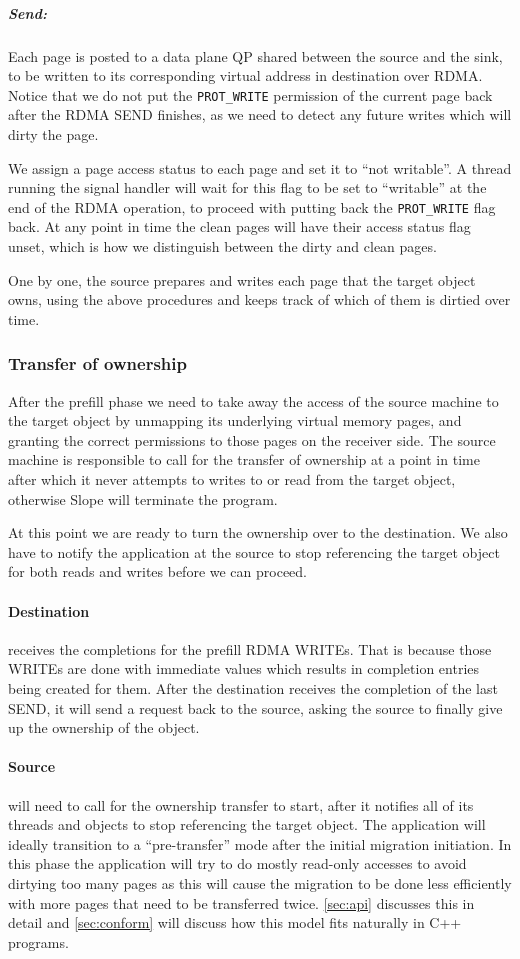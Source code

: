 \subparagraph{Send:} Each page is posted to a data plane QP shared between the
source and the sink, to be written to its corresponding virtual address in
destination over RDMA. Notice that we do not put the \texttt{PROT\_WRITE} permission
of the current page back after the RDMA SEND finishes, as we need to
detect any future writes which will dirty the page.

We assign a page access status to each page and set it to ``not writable''. A
thread running the signal handler will wait for this flag to be set to ``writable''
at the end of the RDMA operation, to proceed with putting back the \texttt{PROT\_WRITE}
flag back.
At any point in time the clean pages will have their access status flag unset,
which is how we distinguish between the dirty and clean pages.

One by one, the source prepares and writes each page that the target object
owns, using the above procedures and keeps track of which of them is dirtied
over time.

\subsubsection{Transfer of ownership}
\label{sec:transowner}
After the prefill phase we need to take away the access of the source machine
to the target object by unmapping its underlying virtual memory pages, and
granting the correct permissions to those pages on the receiver side. The source
machine is responsible to call for the transfer of ownership at a point in time
after which it never attempts to writes to or read from the target object,
otherwise Slope will terminate the program.

At this point we are ready to turn the ownership over to the destination.
We also have to notify the application at the source to stop referencing the
target object for both reads and writes before we can proceed.

\paragraph{Destination} receives the completions for the prefill RDMA WRITEs.
That is because those WRITEs are done with immediate values which results
in completion entries being created for them. After the destination
receives the completion of the
last SEND, it will send a request back to the source, asking the source to
finally give up the ownership of the object.

\paragraph{Source} will need to call for the ownership transfer to start, after
it notifies all of its threads and objects to stop referencing the target
object. The application will
ideally transition to a ``pre-transfer'' mode after the initial migration
initiation. In this phase the application will try to do mostly read-only
accesses to avoid dirtying too many pages as this will cause the migration
to be done less efficiently with more pages that need to be transferred twice.
\autoref{sec:api} discusses this in detail and \autoref{sec:conform} will
discuss how this model fits naturally in C++ programs.

